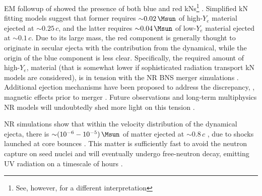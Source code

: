 \ac{EM} followup of \GW{} showed the presence of both blue and red \acp{kN}\footnote{
    See, however, \citet{Waxman:2017sqv} for a different interpretation
} \citep{Villar:2017wcc}.
Simplified \ac{kN} fitting models suggest that former requires ${\sim}0.02\,\Msun$ of high-$Y_e$ 
material ejected at ${\sim}0.25\,c$, and the latter requires ${\sim}0.04\,\Msun$ of low-$Y_e$ 
material ejected at ${\sim}0.1\,c$. Due to its large mass, the red component is 
generally thought to originate in secular ejecta with the contribution from the dynamical, while 
the origin of the blue component is less clear. Specifically, the required amount of high-$Y_e$,
material (that is somewhat lower if sophisticated radiation transport \ac{kN} models are considered),
is in tension with the \ac{NR} \ac{BNS} merger simulations 
\citep{Sekiguchi:2016bjd,Siegel:2019mlp,Perego:2017wtu,Kawaguchi:2018ptg}.
Additional ejection mechanisms have been proposed to address the discrepancy, \eg, 
magnetic effects prior to merger \citep{Metzger:2018qfl,Fernandez:2018kax,Radice:2018ghv}. 
Future observations and long-term multiphysics \ac{NR} models will undoubtedly shed more light on this tension \citep{Metzger:2018qfl}.

\ac{NR} simulations show that within the velocity distribution of the dynamical ejecta, 
there is ${\sim}(10^{-6}-10^{-5})\,\Msun$ of matter ejected at ${\sim}0.8\,c$ 
\citep{Metzger:2014yda,Hotokezaka:2018gmo,Radice:2018pdn,Radice:2018ghv}, due to shocks launched 
at core bounces \citep{Radice:2018pdn}.
This matter is sufficiently fast to avoid the neutron capture on seed nuclei 
and will eventually undergo free-neutron decay, emitting 
\ac{UV} radiation on a timescale of hours \citep{Metzger:2014yda}. 

